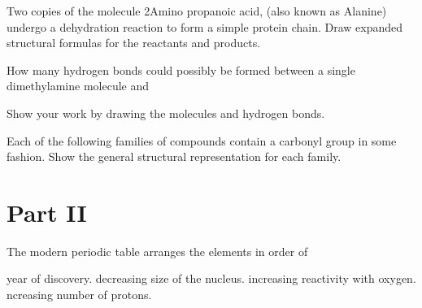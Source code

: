\documentclass[addpoints, 12pt]{exam}
\begin{document}
\begin{questions}
\question[10] Two copies of the molecule 2Amino propanoic acid, (also
known as Alanine) undergo a dehydration reaction to form a simple
protein chain.  Draw expanded structural formulas for the reactants
and products.
\vspace{2cm}

\question[10] How many hydrogen bonds could possibly be formed between
a single dimethylamine molecule and
Show your work by drawing the molecules and hydrogen bonds.
\vspace{2cm}


\question[10] Each of the following families of compounds contain a
carbonyl group in some fashion.  Show the general structural
representation for each family.


\newpage


\section*{Part II}

\question[2] The modern periodic table arranges the elements in order of
\begin{choices}
\choice year of discovery.
\choice decreasing size of the nucleus.
\choice increasing reactivity with oxygen.
\choice ncreasing number of protons.
\end{choices}



\end{questions}
\end{document}
